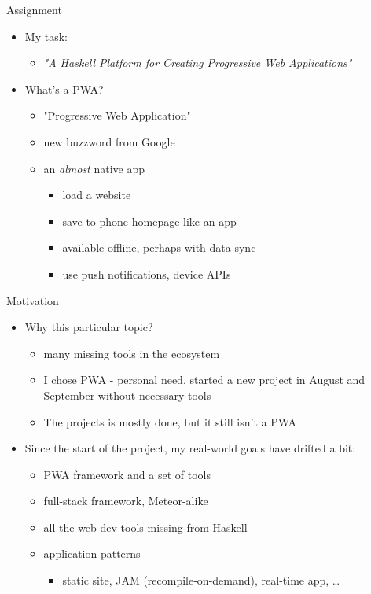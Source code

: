 \documentclass[presentation]{beamer}
\begin{document}
\begin{frame}[label={sec:orga9449ac}]{Assignment}
\begin{itemize}
\item My task:
\begin{itemize}
\item \emph{"A Haskell Platform for Creating Progressive Web Applications"}
\end{itemize}
\end{itemize}

\pause

\begin{itemize}
\item What's a PWA?
\begin{itemize}
\item "Progressive Web Application"
\item new buzzword from Google
\item an \emph{almost} native app
\begin{itemize}
\item load a website
\item save to phone homepage like an app
\item available offline, perhaps with data sync
\item use push notifications, device APIs
\end{itemize}
\end{itemize}
\end{itemize}
\end{frame}

\begin{frame}[label={sec:orgbdd1a29}]{Motivation}
\begin{itemize}
\item Why this particular topic?
\begin{itemize}
\item many missing tools in the ecosystem
\item I chose PWA - personal need, started a new project in August and September
without necessary tools
\item The projects is mostly done, but it still isn't a PWA
\end{itemize}
\end{itemize}

\pause

\begin{itemize}
\item Since the start of the project, my real-world goals have drifted a bit:
\begin{itemize}
\item PWA framework and a set of tools
\item full-stack framework, Meteor-alike
\item all the web-dev tools missing from Haskell
\item application patterns
\begin{itemize}
\item static site, JAM (recompile-on-demand), real-time app, \ldots{}
\end{itemize}
\end{itemize}
\end{itemize}
\end{frame}
\end{document}
